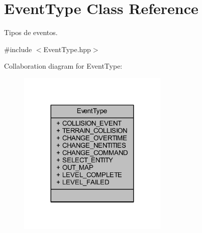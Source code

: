 \hypertarget{class_event_type}{\section{Event\+Type Class Reference}
\label{class_event_type}
}


Tipos de eventos.  




{\ttfamily \#include $<$Event\+Type.\+hpp$>$}



Collaboration diagram for Event\+Type\+:
\nopagebreak
\begin{figure}[H]
\begin{center}
\leavevmode
\includegraphics[width=203pt]{d1/db9/class_event_type__coll__graph}
\end{center}
\end{figure}
